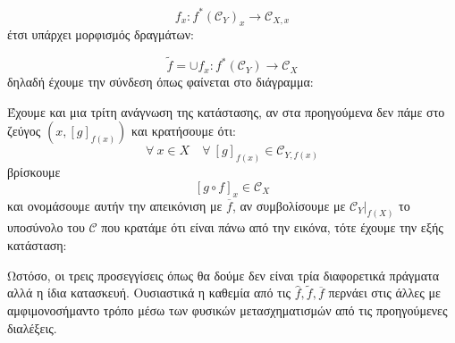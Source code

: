 $$f_x : f^*(\mathcal{C}_Y)_x \longrightarrow \mathcal{C}_{X,x}$$ έτσι υπάρχει μορφισμός δραγμάτων:

$$\tilde{f}= \cup f_x: f^*(\mathcal{C}_Y) \longrightarrow \mathcal{C}_X$$ δηλαδή έχουμε την σύνδεση όπως φαίνεται στο διάγραμμα:


\begin{figure}[H]
    \centering
\end{figure}

\noindent Έχουμε και μια τρίτη ανάγνωση της κατάστασης, αν στα προηγούμενα δεν πάμε στο ζεύγος $(x,[g]_{f(x)})$ και κρατήσουμε ότι:
$$\forall \ x \in X \quad \forall  \ [g]_{f(x)} \in \mathcal{C}_{Y,f(x)}$$ βρίσκουμε
$$[g\circ f]_x \in \mathcal{C}_X$$ και ονομάσουμε αυτήν την απεικόνιση με $\overline{f}$, αν συμβολίσουμε με $\mathcal{C}_Y|_{f(X)}$ το υποσύνολο του $\mathcal{C}$ που κρατάμε ότι είναι πάνω από την εικόνα, τότε έχουμε την εξής κατάσταση:

\begin{figure}[H]
    \centering
\end{figure}

\noindent Ωστόσο, οι τρεις προσεγγίσεις όπως θα δούμε δεν είναι τρία διαφορετικά πράγματα αλλά η ίδια κατασκευή. Ουσιαστικά η καθεμία από τις $\hat{f},\tilde{f}, \overline{f}$ περνάει στις άλλες με αμφιμονοσήμαντο τρόπο μέσω των φυσικών μετασχηματισμών από τις προηγούμενες διαλέξεις.